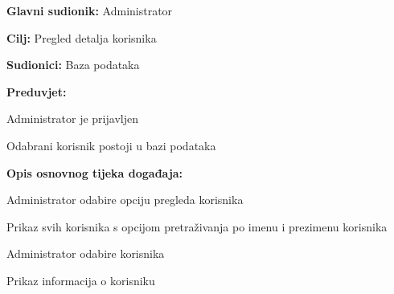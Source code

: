 \documentclass[times, utf8, zavrsni]{fer}
\newenvironment{packed_enum}{
	\begin{enumerate}
		\setlength{\itemsep}{0pt}
		\setlength{\parskip}{0pt}
		\setlength{\parsep}{0pt}
	}{\end{enumerate}}
\newenvironment{packed_item}{
	\begin{itemize}
		\setlength{\itemsep}{0pt}
		\setlength{\parskip}{0pt}
		\setlength{\parsep}{0pt}
	}{\end{itemize}}
\begin{document}
			\noindent {}
					\begin{packed_item}
						
						\item \textbf{Glavni sudionik: } Administrator
						\item  \textbf{Cilj:} Pregled detalja korisnika
						\item  \textbf{Sudionici:} Baza podataka
						\item  \textbf{Preduvjet:} 
						
						\item[] \begin{packed_enum}
							
							\item Administrator je prijavljen
							\item Odabrani korisnik postoji u bazi podataka
							
							
						\end{packed_enum}
						
						\item  \textbf{Opis osnovnog tijeka događaja:}
						
						\item[] \begin{packed_enum}
							
							\item Administrator odabire opciju pregleda korisnika
							\item Prikaz svih korisnika s opcijom pretraživanja po imenu i prezimenu korisnika
							\item Administrator odabire korisnika
							\item Prikaz informacija o korisniku
							
							
						\end{packed_enum}
						
					\end{packed_item}
					
\end{document}
